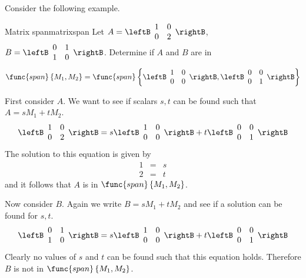 Consider the following example.

\begin{example}{Matrix span}{matrixspan}
Let $A = \leftB \begin{array}{rr}
1 & 0 \\
0 & 2 
\end{array}\rightB$, $B = \leftB \begin{array}{rr}
0 & 1 \\
1 & 0 
\end{array}\rightB$. 
Determine if $A$ and $B$ are in 
\[
\func{span}\left\{ M_1, M_2 \right\} = \func{span} \left\{ \leftB \begin{array}{rr}
1 & 0 \\
0 & 0 
\end{array}\rightB, \leftB \begin{array}{rr}
0 & 0 \\
0 & 1 
\end{array}\rightB \right\}\] 
\end{example}

\begin{solution}

First consider $A$. We want to see if scalars $s,t$ can be found such that $A = s M_1 + t M_2$. 
\begin{equation*}
\leftB \begin{array}{rr}
1 & 0 \\
0 & 2 
\end{array}\rightB = 
s \leftB \begin{array}{rr}
1 & 0 \\
0 & 0 
\end{array}\rightB + t \leftB \begin{array}{rr}
0 & 0 \\
0 & 1 
\end{array}\rightB
\end{equation*}
The solution to this equation is given by 
\begin{eqnarray*}
1 &=& s \\
2 &=& t
\end{eqnarray*}
and it follows that $A$ is in $\func{span} \left\{ M_1, M_2 \right\}$. 

Now consider $B$. Again we write $B = sM_1 + t M_2$ and see if a solution can be found for $s, t$. 
\begin{equation*}
\leftB \begin{array}{rr}
0 & 1 \\
1 & 0 
\end{array}\rightB = 
s \leftB \begin{array}{rr}
1 & 0 \\
0 & 0 
\end{array}\rightB + t \leftB \begin{array}{rr}
0 & 0 \\
0 & 1 
\end{array}\rightB
\end{equation*}
Clearly no values of $s$ and $t$ can be found such that this equation holds. Therefore $B$ is not in $\func{span} \left\{ M_1, M_2 \right\}$.
\end{solution}

